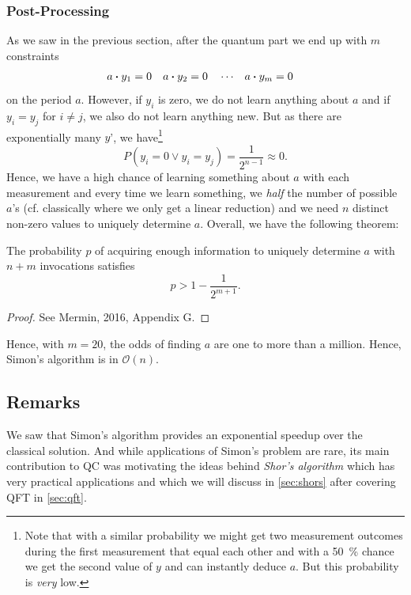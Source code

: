 			\subsubsection{Post-Processing}
				As we saw in the previous section, after the quantum part we end up with \(m\) constraints
				\begin{align}
					a \dotproduct y_1 &= 0 &
					a \dotproduct y_2 &= 0 &
					&\cdots&
					a \dotproduct y_m &= 0
				\end{align}
				on the period \(a\). However, if \(y_i\) is zero, we do not learn anything about \(a\) and if \(y_i = y_j\) for \(i \neq j\), we also do not learn anything new. But as there are exponentially many \(y\)', we have\footnote{Note that with a similar probability we might get two measurement outcomes during the first measurement that equal each other and with a \SI{50}{\percent} chance we get the second value of \(y\) and can instantly deduce \(a\). But this probability is \emph{very} low.}
				\begin{equation}
					P(y_i = 0 \lor y_i = y_j) = \frac{1}{2^{n - 1}} \approx 0.
				\end{equation}
				Hence, we have a high chance of learning something about \(a\) with each measurement and every time we learn something, we \emph{half} the number of possible \(a\)'s (cf. classically where we only get a linear reduction) and we need \(n\) distinct non-zero values to uniquely determine \(a\). Overall, we have the following theorem:

				\begin{theorem}
					The probability \(p\) of acquiring enough information to uniquely determine \(a\) with \(n + m\) invocations satisfies
					\begin{equation}
						p > 1 - \frac{1}{2^{m + 1}}.
					\end{equation}
				\end{theorem}
				\begin{proof}
					See Mermin, 2016, Appendix G.
				\end{proof}

				Hence, with \(m = 20\), the odds of finding \(a\) are one to more than a million. Hence, Simon's algorithm is in \( \mathcal{O}(n) \).

		\subsection{Remarks}
			We saw that Simon's algorithm provides an exponential speedup over the classical solution. And while applications of Simon's problem are rare, its main contribution to \ac{QC} was motivating the ideas behind \emph{Shor's algorithm} which has very practical applications and which we will discuss in \autoref{sec:shors} after covering \ac{QFT} in \autoref{sec:qft}.


